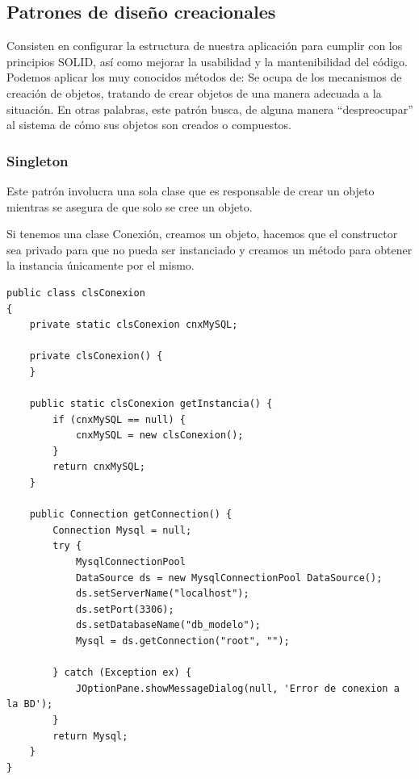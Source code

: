 \documentclass[twoside,twocolumn]{article}
\begin{document}
\subsection{Patrones de diseño creacionales}


Consisten en configurar la estructura de nuestra aplicación para cumplir con los principios SOLID, así como mejorar la usabilidad y la mantenibilidad del código. Podemos aplicar los muy conocidos métodos de:
Se ocupa de los mecanismos de creación de objetos, tratando de crear objetos de una manera adecuada a la situación.
En otras palabras, este patrón busca, de alguna manera “despreocupar” al sistema de cómo sus objetos son creados o compuestos.



\subsubsection{Singleton}


Este patrón involucra una sola clase que es responsable de crear un objeto mientras se asegura de que solo se cree un objeto. 



Si tenemos una clase Conexión, creamos un objeto, hacemos que el constructor sea privado para que no pueda ser instanciado y creamos un método para obtener la instancia únicamente por el mismo.
\lstset{breaklines=true,style=sharpc}
\begin{lstlisting}
public class clsConexion
{
    private static clsConexion cnxMySQL;

    private clsConexion() {
    }    

    public static clsConexion getInstancia() {
        if (cnxMySQL == null) {
            cnxMySQL = new clsConexion();
        }
        return cnxMySQL;
    }

    public Connection getConnection() {
        Connection Mysql = null;
        try {
            MysqlConnectionPool 
            DataSource ds = new MysqlConnectionPool DataSource();
            ds.setServerName("localhost");
            ds.setPort(3306);
            ds.setDatabaseName("db_modelo");
            Mysql = ds.getConnection("root", "");

        } catch (Exception ex) {
            JOptionPane.showMessageDialog(null, 'Error de conexion a la BD');
        }
        return Mysql;
    }
}
\end{lstlisting}
\end{document}
